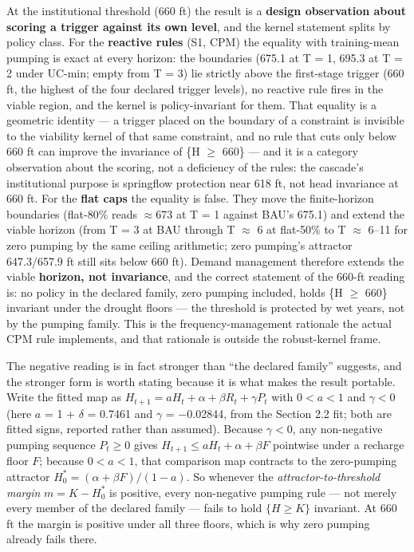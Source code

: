 \documentclass[11pt]{article}
\begin{document}
At the institutional threshold (660 ft) the result is a \textbf{design
observation about scoring a trigger against its own level}, and the
kernel statement splits by policy class. For the \textbf{reactive rules}
(S1, CPM) the equality with training-mean pumping is exact at every
horizon: the boundaries (675.1 at T = 1, 695.3 at T = 2 under UC-min;
empty from T = 3) lie strictly above the first-stage trigger (660 ft,
the highest of the four declared trigger levels), no reactive rule fires
in the viable region, and the kernel is policy-invariant for them. That
equality is a geometric identity --- a trigger placed on the boundary of
a constraint is invisible to the viability kernel of that same
constraint, and no rule that cuts only below 660 ft can improve the
invariance of \{H \ensuremath{\geq} 660\} --- and it is a category observation about the
scoring, not a deficiency of the rules: the cascade's institutional
purpose is springflow protection near 618 ft, not head invariance at 660
ft. For the \textbf{flat caps} the equality is false. They move the
finite-horizon boundaries (flat-80\% reads \ensuremath{\approx}673 at T = 1 against BAU's
675.1) and extend the viable horizon (from T = 3 at BAU through T \ensuremath{\approx} 6 at
flat-50\% to T \ensuremath{\approx} 6--11 for zero pumping by the same ceiling arithmetic;
zero pumping's attractor 647.3/657.9 ft still sits below 660 ft). Demand
management therefore extends the viable \textbf{horizon, not
invariance}, and the correct statement of the 660-ft reading is: no
policy in the declared family, zero pumping included, holds \{H \ensuremath{\geq} 660\}
invariant under the drought floors --- the threshold is protected by wet
years, not by the pumping family. This is the frequency-management
rationale the actual CPM rule implements, and that rationale is outside
the robust-kernel frame.

The negative reading is in fact stronger than ``the declared family''
suggests, and the stronger form is worth stating because it is what
makes the result portable. Write the fitted map as \(H_{t+1} = aH_t +
\alpha + \beta R_t + \gamma P_t\) with \(0 < a < 1\) and \(\gamma < 0\)
(here \(a\) = 1 + \(\delta\) = 0.7461 and \(\gamma\) = \ensuremath{-}0.02844, from the
Section 2.2 fit; both are fitted signs, reported rather than assumed). Because \(\gamma < 0\), any
non-negative pumping sequence \(P_t \geq 0\) gives \(H_{t+1} \leq aH_t +
\alpha + \beta F\) pointwise under a recharge floor \(F\); because \(0 < a
< 1\), that comparison map contracts to the zero-pumping attractor
\(H^{\ast}_0 = (\alpha + \beta F)/(1-a)\). So whenever the
\emph{attractor-to-threshold margin} \(m = K - H^{\ast}_0\) is positive,
every non-negative pumping rule --- not merely every member of the
declared family --- fails to hold \(\{H \geq K\}\) invariant. At 660 ft
the margin is positive under all three floors, which is why zero pumping
already fails there.
\end{document}

